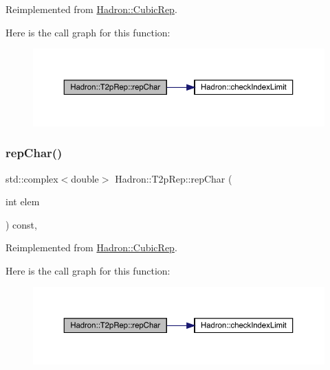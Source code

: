 Reimplemented from \mbox{\hyperlink{structHadron_1_1CubicRep_af45227106e8e715e84b0af69cd3b36f8}{Hadron\+::\+Cubic\+Rep}}.

Here is the call graph for this function\+:
\nopagebreak
\begin{figure}[H]
\begin{center}
\leavevmode
\includegraphics[width=350pt]{d8/d6b/structHadron_1_1T2pRep_a42f3c130c87e354a8453c53cdb66e1a5_cgraph}
\end{center}
\end{figure}
\mbox{\label{structHadron_1_1T2pRep_a42f3c130c87e354a8453c53cdb66e1a5}} 
\subsubsection{\texorpdfstring{repChar()}{repChar()}\hspace{0.1cm}{\footnotesize\ttfamily [3/3]}}
{\footnotesize\ttfamily std\+::complex$<$double$>$ Hadron\+::\+T2p\+Rep\+::rep\+Char (\begin{DoxyParamCaption}\item[{int}]{elem }\end{DoxyParamCaption}) const\hspace{0.3cm}{\ttfamily [inline]}, {\ttfamily [virtual]}}



Reimplemented from \mbox{\hyperlink{structHadron_1_1CubicRep_af45227106e8e715e84b0af69cd3b36f8}{Hadron\+::\+Cubic\+Rep}}.

Here is the call graph for this function\+:
\nopagebreak
\begin{figure}[H]
\begin{center}
\leavevmode
\includegraphics[width=350pt]{d8/d6b/structHadron_1_1T2pRep_a42f3c130c87e354a8453c53cdb66e1a5_cgraph}
\end{center}
\end{figure}
\mbox{\label{structHadron_1_1T2pRep_a9800949d2a6f8dcd4dd356947cae0488}} 
